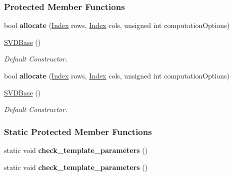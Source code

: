 \subsubsection*{Protected Member Functions}
\begin{DoxyCompactItemize}
\item 
\mbox{\label{group___s_v_d___module_a7be177a4c6e8e3fbf2bec40cb527321c}} 
bool {\bfseries allocate} (\hyperlink{group___s_v_d___module_a6229a37997eca1072b52cca5ee7a2bec}{Index} rows, \hyperlink{group___s_v_d___module_a6229a37997eca1072b52cca5ee7a2bec}{Index} cols, unsigned int computation\+Options)
\item 
\hyperlink{group___s_v_d___module_abed06fc6f4b743e1f76a7b317539da87}{S\+V\+D\+Base} ()
\begin{DoxyCompactList}\small\item\em Default Constructor. \end{DoxyCompactList}\item 
\mbox{\label{group___s_v_d___module_ad81b1a1d49bb10a16a2e23ddd9b91985}} 
bool {\bfseries allocate} (\hyperlink{group___s_v_d___module_a6229a37997eca1072b52cca5ee7a2bec}{Index} rows, \hyperlink{group___s_v_d___module_a6229a37997eca1072b52cca5ee7a2bec}{Index} cols, unsigned int computation\+Options)
\item 
\hyperlink{group___s_v_d___module_abed06fc6f4b743e1f76a7b317539da87}{S\+V\+D\+Base} ()
\begin{DoxyCompactList}\small\item\em Default Constructor. \end{DoxyCompactList}\end{DoxyCompactItemize}
\subsubsection*{Static Protected Member Functions}
\begin{DoxyCompactItemize}
\item 
\mbox{\label{group___s_v_d___module_aec918dd80eeb2d5bf628f15cda83053f}} 
static void {\bfseries check\+\_\+template\+\_\+parameters} ()
\item 
\mbox{\label{group___s_v_d___module_aec918dd80eeb2d5bf628f15cda83053f}} 
static void {\bfseries check\+\_\+template\+\_\+parameters} ()
\end{DoxyCompactItemize}
